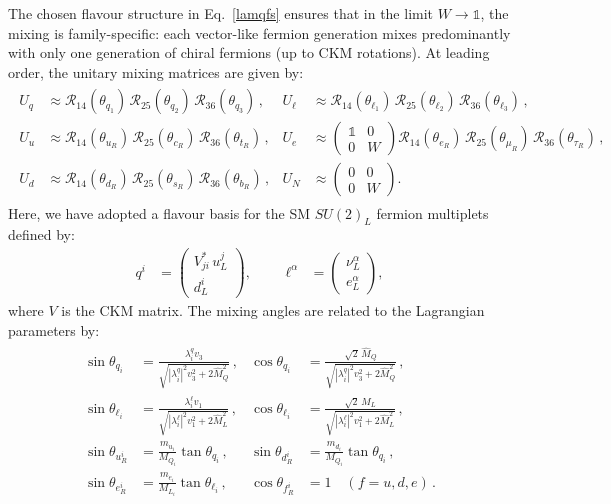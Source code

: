 The chosen flavour structure in Eq.~\eqref{lamqfs} ensures that in the limit $W \to \mathbb{1}$, the mixing is family-specific: each vector-like fermion generation mixes predominantly with only one generation of chiral fermions (up to CKM rotations). At leading order, the unitary mixing matrices are given by:
{\footnotesize
\begin{align*}
  \begin{aligned}
    U_q &\approx \mathcal{R}_{14}(\theta_{q_1}) \, \mathcal{R}_{25}(\theta_{q_2}) \, \mathcal{R}_{36}(\theta_{q_3})\,, &
    U_\ell &\approx \mathcal{R}_{14}(\theta_{\ell_1}) \, \mathcal{R}_{25}(\theta_{\ell_2}) \, \mathcal{R}_{36}(\theta_{\ell_3})\,,\\
    U_u &\approx \mathcal{R}_{14}(\theta_{u_R}) \, \mathcal{R}_{25}(\theta_{c_R}) \, \mathcal{R}_{36}(\theta_{t_R})\,, &
    U_e &\approx
    \begin{pmatrix}
      \mathbb{1} & 0 \\
      0 & W
    \end{pmatrix}
    \mathcal{R}_{14}(\theta_{e_R}) \, \mathcal{R}_{25}(\theta_{\mu_R}) \, \mathcal{R}_{36}(\theta_{\tau_R})\,,\\
    U_d &\approx \mathcal{R}_{14}(\theta_{d_R}) \, \mathcal{R}_{25}(\theta_{s_R}) \, \mathcal{R}_{36}(\theta_{b_R})\,, &
    U_N &\approx
    \begin{pmatrix}
      0 & 0 \\
      0 & W
    \end{pmatrix}.
  \end{aligned}
\end{align*}
}%
Here, we have adopted a flavour basis for the SM $SU(2)_L$ fermion multiplets defined by:
\begin{align}
\label{SU2Lfb}
q^i &=
\begin{pmatrix}
V^*_{ji} \, u_L^j \\
d_L^i
\end{pmatrix},
&&&
\ell^\alpha &=
\begin{pmatrix}
\nu_L^\alpha \\
e_L^\alpha
\end{pmatrix},
\end{align}
where $V$ is the CKM matrix. The mixing angles are related to the Lagrangian parameters by:
\begin{align}\label{eq:mixingangles}
\begin{aligned}
\sin\theta_{q_i} &= \frac{\lambda_i^q v_3}{\sqrt{|\lambda_i^q|^2 v_3^2 + 2 \hat M_Q^2}}\,, &
\cos\theta_{q_i} &= \frac{\sqrt{2} \, \hat M_Q}{\sqrt{|\lambda_i^q|^2 v_3^2 + 2 \hat M_Q^2}}\,, \\[5pt]
\sin\theta_{\ell_i} &= \frac{\lambda_i^\ell v_1}{\sqrt{|\lambda_i^\ell|^2 v_1^2 + 2 \hat M_L^2}}\,, &
\cos\theta_{\ell_i} &= \frac{\sqrt{2} \, \hat M_L}{\sqrt{|\lambda_i^\ell|^2 v_1^2 + 2 \hat M_L^2}}\,, \\[5pt]
\sin\theta_{u_R^i} &= \frac{m_{u_i}}{M_{Q_i}} \tan\theta_{q_i}\,, &
\sin\theta_{d_R^i} &= \frac{m_{d_i}}{M_{Q_i}} \tan\theta_{q_i}\,, \\[5pt]
\sin\theta_{e_R^i} &= \frac{m_{e_i}}{M_{L_i}} \tan\theta_{\ell_i}\,, &
\cos\theta_{f_R^i} &= 1 \quad (f = u, d, e)\,.
\end{aligned}
\end{align}
